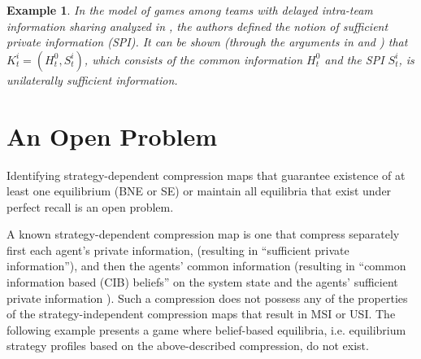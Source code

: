 \documentclass[pdflatex,sn-basic]{sn-jnl}
\theoremstyle{thmstyleone}%
\theoremstyle{thmstyletwo}%
\theoremstyle{thmstylethree}%
\newtheorem{example}{Example}
\begin{document}
\begin{example}
    In the model of games among teams with delayed intra-team information sharing {analyzed} in \cite{tang2022dynamic}, the authors defined the notion of sufficient private information (SPI). It can be shown (through the arguments in {\cite[Section 4.3]{tang2022dynamic} and \cite[Chapters 4.6.1 and 4.6.2]{tangthesis}}) that $K_t^i = (H_t^0, S_t^i)$, which consists of the common information $H_t^0$ and the SPI $S_t^i$, is unilaterally sufficient information.
\end{example}

\section{An Open Problem}\label{sec:openproblems}
Identifying strategy-dependent compression maps that guarantee existence of at least one equilibrium (BNE or SE) or maintain all equilibria that exist under perfect recall is an open problem.

{A known strategy-dependent compression map is one that compress separately first each agent's private information, (resulting in ``sufficient private information''), and then the agents' common information (resulting in ``common information based (CIB) beliefs''  on the system state and the agents' sufficient private information \citep{ouyang2015oligopoly,ouyang2016dynamic,vasal2019spbe,tang2022dynamic,ouyang2024approach}). 
Such a compression does not possess any of the properties of the strategy-independent compression maps that result in MSI or USI. The following example presents a game where belief-based equilibria, i.e. equilibrium strategy profiles based on the above-described compression, do not exist.}
\end{document}
